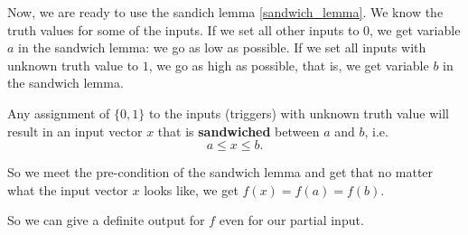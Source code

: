 \documentclass[12pt]{amsart}
\begin{document}
Now, we are ready to use the sandich lemma \ref{sandwich_lemma}. 
We know the truth values for some of the inputs. If we set all other 
inputs to 0, we get variable $a$ in the sandwich lemma: we 
go as low as possible. If we set all inputs with unknown truth value 
to $1$, we go as high as possible, that is, we get variable $b$ 
in the sandwich lemma. 

Any assignment of $\{0,1\}$ to the inputs (triggers) with unknown
truth value will result in an input vector $x$ that is {\bf sandwiched} 
between $a$ and $b$, i.e. $$a \leq x \leq b.$$ 

So we meet the pre-condition of the sandwich lemma and get that 
no matter what the input vector $x$ looks like, we get $f(x) = f(a) = f(b)$.

So we can give a definite output for $f$ even for our partial input.
\end{document}
